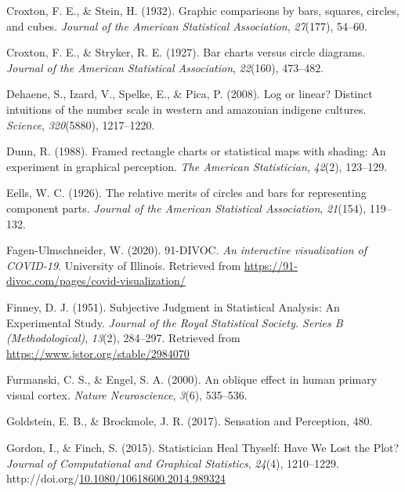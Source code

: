 \documentclass[print]{nuthesis}
\newlength{\cslhangindent}
\newenvironment{CSLReferences}%
{\setlength{\parindent}{0pt}%
\everypar{\setlength{\hangindent}{\cslhangindent}}\ignorespaces}%
{\par}
\begin{document}
\begin{CSLReferences}{1}{0}
\leavevmode\hypertarget{ref-croxton1932graphic}{}%
Croxton, F. E., \& Stein, H. (1932). Graphic comparisons by bars, squares, circles, and cubes. \emph{Journal of the American Statistical Association}, \emph{27}(177), 54--60.

\leavevmode\hypertarget{ref-croxton1927bar}{}%
Croxton, F. E., \& Stryker, R. E. (1927). Bar charts versus circle diagrams. \emph{Journal of the American Statistical Association}, \emph{22}(160), 473--482.

\leavevmode\hypertarget{ref-dehaene2008log}{}%
Dehaene, S., Izard, V., Spelke, E., \& Pica, P. (2008). Log or linear? Distinct intuitions of the number scale in western and amazonian indigene cultures. \emph{Science}, \emph{320}(5880), 1217--1220.

\leavevmode\hypertarget{ref-dunn1988framed}{}%
Dunn, R. (1988). Framed rectangle charts or statistical maps with shading: An experiment in graphical perception. \emph{The American Statistician}, \emph{42}(2), 123--129.

\leavevmode\hypertarget{ref-eells1926relative}{}%
Eells, W. C. (1926). The relative merits of circles and bars for representing component parts. \emph{Journal of the American Statistical Association}, \emph{21}(154), 119--132.

\leavevmode\hypertarget{ref-fagen-ulmschneider_2020}{}%
Fagen-Ulmschneider, W. (2020). 91-DIVOC. \emph{An interactive visualization of COVID-19}. University of Illinois. Retrieved from \url{https://91-divoc.com/pages/covid-visualization/}

\leavevmode\hypertarget{ref-finney_subjective_1951}{}%
Finney, D. J. (1951). Subjective {Judgment} in {Statistical} {Analysis}: {An} {Experimental} {Study}. \emph{Journal of the Royal Statistical Society. Series B (Methodological)}, \emph{13}(2), 284--297. Retrieved from \url{https://www.jstor.org/stable/2984070}

\leavevmode\hypertarget{ref-furmanski2000oblique}{}%
Furmanski, C. S., \& Engel, S. A. (2000). An oblique effect in human primary visual cortex. \emph{Nature Neuroscience}, \emph{3}(6), 535--536.

\leavevmode\hypertarget{ref-goldstein_sensation_2017}{}%
Goldstein, E. B., \& Brockmole, J. R. (2017). Sensation and {Perception}, 480.

\leavevmode\hypertarget{ref-gordon_statistician_2015}{}%
Gordon, I., \& Finch, S. (2015). Statistician {Heal} {Thyself}: {Have} {We} {Lost} the {Plot}? \emph{Journal of Computational and Graphical Statistics}, \emph{24}(4), 1210--1229. http://doi.org/\href{https://doi.org/10.1080/10618600.2014.989324}{10.1080/10618600.2014.989324}


\end{CSLReferences}
\end{document}
